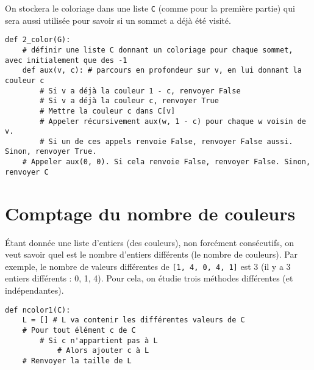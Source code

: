 On stockera le coloriage dans une liste \lstinline{C} (comme pour la première partie) qui sera aussi utilisée pour savoir si un sommet a déjà été
visité.

\begin{lstlisting}
def 2_color(G):
    # définir une liste C donnant un coloriage pour chaque sommet, avec initialement que des -1
    def aux(v, c): # parcours en profondeur sur v, en lui donnant la couleur c
        # Si v a déjà la couleur 1 - c, renvoyer False
        # Si v a déjà la couleur c, renvoyer True
        # Mettre la couleur c dans C[v]
        # Appeler récursivement aux(w, 1 - c) pour chaque w voisin de v.
        # Si un de ces appels renvoie False, renvoyer False aussi. Sinon, renvoyer True.
    # Appeler aux(0, 0). Si cela renvoie False, renvoyer False. Sinon, renvoyer C
\end{lstlisting}



\section*{Comptage du nombre de couleurs}    
Étant donnée une liste d’entiers (des couleurs), non forcément consécutifs, on veut savoir quel est le nombre d’entiers différents
(le nombre de couleurs). Par exemple, le nombre de valeurs différentes de \lstinline{[1, 4, 0, 4, 1]} est 3 (il y a 3 entiers différents :
0, 1, 4). Pour cela, on étudie trois méthodes différentes (et indépendantes).


\begin{lstlisting}
def ncolor1(C):
    L = [] # L va contenir les différentes valeurs de C
    # Pour tout élément c de C
        # Si c n'appartient pas à L
            # Alors ajouter c à L
    # Renvoyer la taille de L
\end{lstlisting}


